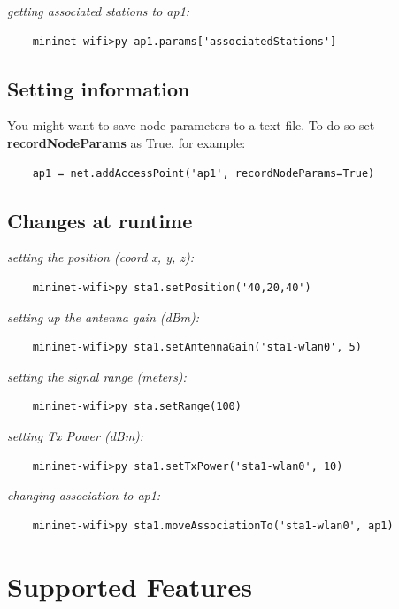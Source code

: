 \noindent \textit{getting associated stations to ap1:}
\begin{verbatim}
    mininet-wifi>py ap1.params['associatedStations']
\end{verbatim}

\subsection{Setting information}

You might want to save node parameters to a text file. To do so set \textbf{recordNodeParams} as True, for example:
\begin{verbatim}
    ap1 = net.addAccessPoint('ap1', recordNodeParams=True)
\end{verbatim}

\subsection{Changes at runtime}

\noindent \textit{setting the position (coord x, y, z):}
\begin{verbatim}
    mininet-wifi>py sta1.setPosition('40,20,40')
\end{verbatim}

\noindent \textit{setting up the antenna gain (dBm):}
\begin{verbatim}
    mininet-wifi>py sta1.setAntennaGain('sta1-wlan0', 5)
\end{verbatim}

\noindent \textit{setting the signal range (meters):}
\begin{verbatim}
    mininet-wifi>py sta.setRange(100)
\end{verbatim}

\noindent \textit{setting Tx Power (dBm):}
\begin{verbatim}
    mininet-wifi>py sta1.setTxPower('sta1-wlan0', 10)
\end{verbatim}

\noindent \textit{changing association to ap1:}
\begin{verbatim}
    mininet-wifi>py sta1.moveAssociationTo('sta1-wlan0', ap1)
\end{verbatim}

\section{Supported Features}

